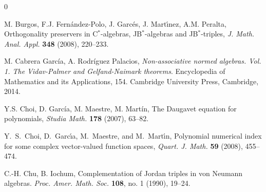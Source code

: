 \documentclass[10pt]{amsart}
\begin{document}
\begin{thebibliography}{0}
		
		
		 M. Burgos, F.J. Fern\'{a}ndez-Polo, J. Garc\'{e}s, J. Mart\'{\i}nez, A.M. Peralta, Orthogonality preservers in C$^*$-algebras, JB$^*$-algebras and JB$^*$-triples, \emph{J. Math. Anal. Appl.} \textbf{348} (2008), 220--233.
		
		
		 M. Cabrera Garc{\'i}a, A. Rodr{\'i}guez Palacios, \emph{Non-associative normed algebras. Vol. 1. The Vidav-Palmer and Gelfand-Naimark theorems}. Encyclopedia of Mathematics and its Applications, 154. Cambridge University Press, Cambridge, 2014.
		
		
		
		
		 Y.S. Choi, D. Garc{\'i}a, M. Maestre, M. Mart{\'i}n, The Daugavet equation for polynomials, \emph{Studia Math.} \textbf{178} (2007), 63--82.
		
		 Y.~S.~Choi, D.~Garc\'{\i}a, M.~Maestre, and M.~Mart\'{\i}n, Polynomial numerical index for some complex vector-valued function spaces, \emph{Quart. J. Math.} \textbf{59} (2008), 455--474.
		
		 C.-H. Chu, B. Iochum, Complementation of Jordan triples in von Neumann algebras. \emph{Proc. Amer. Math. Soc.} \textbf{108}, no. 1 (1990), 19--24.	
		

\end{thebibliography}
\end{document}
